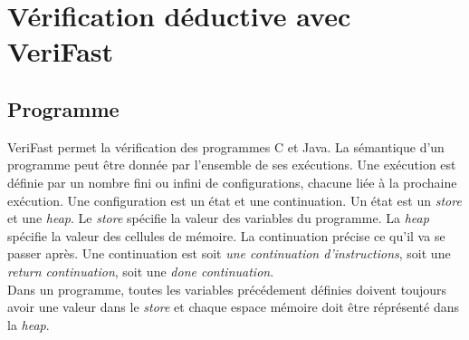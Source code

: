 \documentclass[9pt,openany]{book}
\newcommand{\verifast}{VeriFast}
\begin{document}
\chapter{V\'erification d\'eductive avec \verifast{}}
	\section{Programme}
		\verifast{} permet la v\'erification des programmes C et Java. La s\'emantique d'un programme peut \^etre donn\'ee par l'ensemble de ses ex\'ecutions. Une ex\'ecution est d\'efinie par un nombre fini ou infini de configurations, chacune li\'ee \`a la prochaine ex\'ecution. Une configuration est un \'etat et une continuation. Un \'etat est un \textit{store} et une \textit{heap}. Le \textit{store} sp\'ecifie la valeur des variables du programme. La \textit{heap} sp\'ecifie la valeur des cellules de m\'emoire. La continuation pr\'ecise ce qu'il va se passer apr\`es. Une continuation est soit \textit{une continuation d'instructions}, soit une \textit{return continuation}, soit une \textit{done continuation}.\\
	Dans un programme, toutes les variables pr\'ec\'edement d\'efinies doivent toujours avoir une valeur dans le \textit{store} et chaque espace m\'emoire doit \^etre r\'epr\'esent\'e dans la \textit{heap}.
\end{document}
